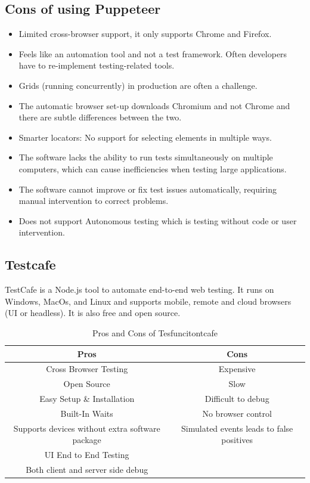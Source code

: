 \documentclass[12pt,a4paper,titlepage]{report}
\begin{document}
\subsection{Cons of using Puppeteer}
\begin{itemize}
 \item Limited cross-browser support, it only supports Chrome and Firefox.
 \item Feels like an automation tool and not a test framework. Often developers have to re-implement testing-related tools.
 \item Grids (running concurrently) in production are often a challenge.
 \item The automatic browser set-up downloads Chromium and not Chrome and there are subtle differences between the two.
 \item Smarter locators: No support for selecting elements in multiple ways.
 \item The software lacks the ability to run tests simultaneously on multiple computers, which can cause inefficiencies when testing large applications.
 \item The software cannot improve or fix test issues automatically, requiring manual intervention to correct problems.
 \item Does not support Autonomous testing which is testing without code or user intervention.
\end{itemize}

\subsection{Testcafe}

TestCafe is a Node.js tool to automate end-to-end web testing. It runs on Windows, MacOs, and Linux and
supports mobile, remote and cloud browsers (UI or headless). It is also free and open source.

\begin{table}[ht]
  \centering
  \small
  \setlength\tabcolsep{6pt}
  \begin{tabular}{|c|c|}
   \hline \textbf
   {Pros} & \textbf {Cons}\\
   \hline\hline
   Cross Browser Testing&Expensive\\
   \hline
   Open Source& Slow\\
   \hline
   Easy Setup \& Installation& Difficult to debug\\
   \hline
   Built-In Waits& No browser control\\
   \hline
   Supports devices without extra software package & Simulated events leads to false positives\\
   \hline
   UI End to End Testing\\
   \hline
   Both client and server side debug \\
   \hline
  \end{tabular}
  \caption{Pros and Cons of Tesfuncitontcafe}
 \end{table}
\end{document}
